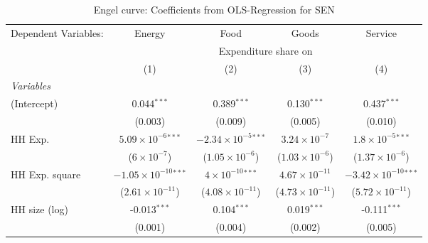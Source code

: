 
\begin{table}[htbp!]
   \centering
   \small
   \begin{adjustbox}{width = 1\textwidth, max height = 0.95\textheight, center}
      \begin{threeparttable}[b]
         \caption{\label{tab:Engel_parametric_SEN} Engel curve: Coefficients from OLS-Regression for SEN}
         \begin{tabular}{lcccc}
            \tabularnewline \midrule \midrule
            Dependent Variables: & Energy                          & Food                           & Goods                    & Service\\  
             & \multicolumn{4}{c}{Expenditure share on} \\ 
                                 & (1)                             & (2)                            & (3)                      & (4)\\  
            \midrule
            \emph{Variables}\\
            (Intercept)          & 0.044$^{***}$                   & 0.389$^{***}$                  & 0.130$^{***}$            & 0.437$^{***}$\\   
                                 & (0.003)                         & (0.009)                        & (0.005)                  & (0.010)\\   
            HH Exp.              & $5.09\times 10^{-6}$$^{***}$    & $-2.34\times 10^{-5}$$^{***}$  & $3.24\times 10^{-7}$     & $1.8\times 10^{-5}$$^{***}$\\    
                                 & ($6\times 10^{-7}$)             & ($1.05\times 10^{-6}$)         & ($1.03\times 10^{-6}$)   & ($1.37\times 10^{-6}$)\\    
            HH Exp. square       & $-1.05\times 10^{-10}$$^{***}$  & $4\times 10^{-10}$$^{***}$     & $4.67\times 10^{-11}$    & $-3.42\times 10^{-10}$$^{***}$\\    
                                 & ($2.61\times 10^{-11}$)         & ($4.08\times 10^{-11}$)        & ($4.73\times 10^{-11}$)  & ($5.72\times 10^{-11}$)\\    
            HH size (log)        & -0.013$^{***}$                  & 0.104$^{***}$                  & 0.019$^{***}$            & -0.111$^{***}$\\   
                                 & (0.001)                         & (0.004)                        & (0.002)                  & (0.005)\\   
            \midrule 

\end{tabular}
\end{threeparttable}
\end{adjustbox}
\end{table}
